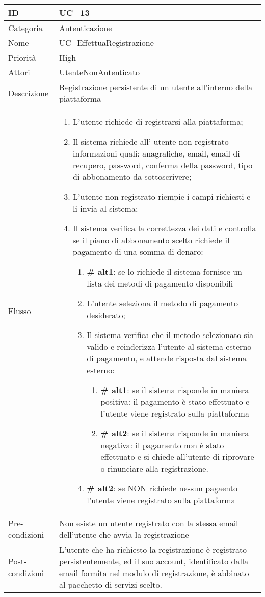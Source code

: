 \begin{center}
\begin{tabular}{ |p{2cm}|p{13cm}|  }
\hline
ID & UC\_13 \\\hline
Categoria & Autenticazione \\\hline
Nome & UC\_EffettuaRegistrazione \\\hline
Priorità & High \\\hline
Attori &  UtenteNonAutenticato \\\hline
Descrizione & Registrazione persistente di un utente all'interno della piattaforma \\\hline
Flusso &  	\begin{enumerate}
			\item L'utente richiede di registrarsi alla piattaforma;
			\item Il sistema richiede all' utente non registrato informazioni quali: anagrafiche, email, email di recupero, password, conferma della password, tipo di abbonamento da sottoscrivere;
			\item L'utente non registrato riempie i campi richiesti e li invia al sistema;
			\item Il sistema verifica la correttezza dei dati e controlla se il piano di abbonamento scelto richiede il pagamento di una somma di denaro:
			\begin{enumerate}[  ]
				\item\textbf{\# alt1}: se lo richiede il sistema fornisce un lista dei metodi di pagamento disponibili
				\item L'utente seleziona il metodo di pagamento desiderato;
				\item Il sistema verifica che il metodo selezionato sia valido e reinderizza l'utente al sistema esterno di pagamento, e attende risposta dal sistema esterno:
				\begin{enumerate}[label*=\arabic*.]
					\item \textbf{\# alt1}: se il sistema risponde in maniera positiva: il pagamento è stato effettuato e l'utente viene registrato sulla piattaforma 
					\item \textbf{\# alt2}: se il sistema risponde in maniera negativa: il pagamento non è stato effettuato e si chiede all'utente di riprovare o rinunciare alla registrazione.
				\end{enumerate}
				\item\textbf{\# alt2}: se NON richiede nessun pagaento l'utente viene registrato sulla piattaforma
			\end{enumerate}
		\end{enumerate}\\\hline
Pre-condizioni &  Non esiste un utente registrato con la stessa email dell'utente che avvia la registrazione\\\hline
Post-condizioni &  L'utente che ha richiesto la registrazione è registrato persistentemente, ed il suo account, identificato dalla email formita nel modulo di registrazione, è abbinato al pacchetto di servizi scelto.\\\hline
\end{tabular}
\label{table_use_case:13}\newline


\end{center}
